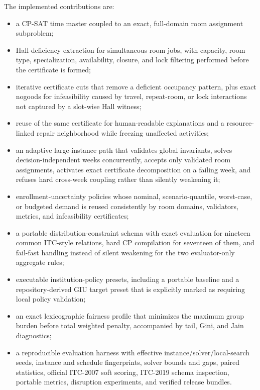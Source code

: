 The implemented contributions are:
\begin{itemize}[leftmargin=*]
  \item a CP-SAT time master coupled to an exact, full-domain room assignment subproblem;
  \item Hall-deficiency extraction for simultaneous room jobs, with capacity, room type, specialization, availability, closure, and lock filtering performed before the certificate is formed;
  \item iterative certificate cuts that remove a deficient occupancy pattern, plus exact nogoods for infeasibility caused by travel, repeat-room, or lock interactions not captured by a slot-wise Hall witness;
  \item reuse of the same certificate for human-readable explanations and a resource-linked repair neighborhood while freezing unaffected activities;
  \item an adaptive large-instance path that validates global invariants, solves decision-independent weeks concurrently, accepts only validated room assignments, activates exact certificate decomposition on a failing week, and refuses hard cross-week coupling rather than silently weakening it;
  \item enrollment-uncertainty policies whose nominal, scenario-quantile, worst-case, or budgeted demand is reused consistently by room domains, validators, metrics, and infeasibility certificates;
  \item a portable distribution-constraint schema with exact evaluation for nineteen common ITC-style relations, hard CP compilation for seventeen of them, and fail-fast handling instead of silent weakening for the two evaluator-only aggregate rules;
  \item executable institution-policy presets, including a portable baseline and a repository-derived GIU target preset that is explicitly marked as requiring local policy validation;
  \item an exact lexicographic fairness profile that minimizes the maximum group burden before total weighted penalty, accompanied by tail, Gini, and Jain diagnostics;
  \item a reproducible evaluation harness with effective instance/solver/local-search seeds, instance and schedule fingerprints, solver bounds and gaps, paired statistics, official ITC-2007 soft scoring, ITC-2019 schema inspection, portable metrics, disruption experiments, and verified release bundles.
\end{itemize}

